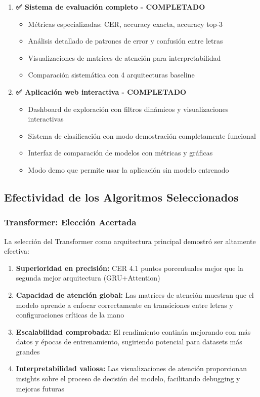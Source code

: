 \documentclass[12pt,a4paper]{article}
\begin{document}
\begin{enumerate}
    \item \textbf{✅ Sistema de evaluación completo - COMPLETADO}
    \begin{itemize}
        \item Métricas especializadas: CER, accuracy exacta, accuracy top-3
        \item Análisis detallado de patrones de error y confusión entre letras
        \item Visualizaciones de matrices de atención para interpretabilidad
        \item Comparación sistemática con 4 arquitecturas baseline
    \end{itemize}
    
    \item \textbf{✅ Aplicación web interactiva - COMPLETADO}
    \begin{itemize}
        \item Dashboard de exploración con filtros dinámicos y visualizaciones interactivas
        \item Sistema de clasificación con modo demostración completamente funcional
        \item Interfaz de comparación de modelos con métricas y gráficas
        \item Modo demo que permite usar la aplicación sin modelo entrenado
    \end{itemize}
\end{enumerate}

\subsection{Efectividad de los Algoritmos Seleccionados}

\subsubsection{Transformer: Elección Acertada}
La selección del Transformer como arquitectura principal demostró ser altamente efectiva:

\begin{enumerate}
    \item \textbf{Superioridad en precisión:} CER 4.1 puntos porcentuales mejor que la segunda mejor arquitectura (GRU+Attention)
    
    \item \textbf{Capacidad de atención global:} Las matrices de atención muestran que el modelo aprende a enfocar correctamente en transiciones entre letras y configuraciones críticas de la mano
    
    \item \textbf{Escalabilidad comprobada:} El rendimiento continúa mejorando con más datos y épocas de entrenamiento, sugiriendo potencial para datasets más grandes
    
    \item \textbf{Interpretabilidad valiosa:} Las visualizaciones de atención proporcionan insights sobre el proceso de decisión del modelo, facilitando debugging y mejoras futuras
\end{enumerate}
\end{document}
